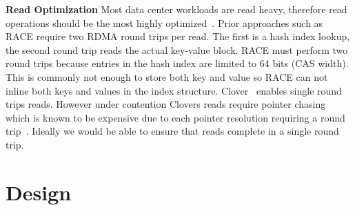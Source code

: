 \textbf{Read Optimization} Most data center workloads are
read heavy, therefore read operations should be the most
highly optimized~\cite{datacenter-workloads}. Prior
approaches such as RACE require two RDMA round trips per
read. The first is a hash index lookup, the second round
trip reads the actual key-value block. RACE must perform two
round trips because entries in the hash index are limited to
64 bits (CAS width). This is commonly not enough to store
both key and value so RACE can not inline both keys and
values in the index structure. Clover~\cite{clover} enables
single round trips reads. However under contention Clovers
reads require pointer chasing which is known to be expensive
due to each pointer resolution requiring a round
trip~\cite{clio,clover,pointer-chaising}. Ideally we would
be able to ensure that reads complete in a single round
trip.


\section{Design}
\label{sec:design}

